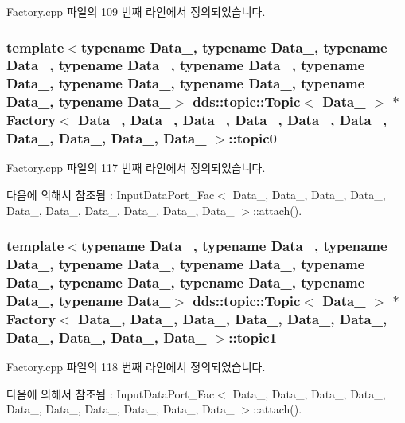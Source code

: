 Factory.\+cpp 파일의 109 번째 라인에서 정의되었습니다.

\subsubsection[{\texorpdfstring{topic0}{topic0}}]{\setlength{\rightskip}{0pt plus 5cm}template$<$typename Data\+\_, typename Data\+\_, typename Data\+\_, typename Data\+\_, typename Data\+\_, typename Data\+\_, typename Data\+\_, typename Data\+\_, typename Data\+\_, typename Data\+\_$>$ dds\+::topic\+::\+Topic$<$ Data\+\_ $>$ $\ast$ {\bf Factory}$<$ Data\+\_, Data\+\_, Data\+\_, Data\+\_, Data\+\_, Data\+\_, Data\+\_, Data\+\_, Data\+\_, Data\+\_ $>$\+::topic0}\hypertarget{classFactory_a575dfe382a4cbf779aa8b141fb38f2c4}{}\label{classFactory_a575dfe382a4cbf779aa8b141fb38f2c4}


Factory.\+cpp 파일의 117 번째 라인에서 정의되었습니다.



다음에 의해서 참조됨 \+:  Input\+Data\+Port\+\_\+\+Fac$<$ Data\+\_, Data\+\_, Data\+\_, Data\+\_, Data\+\_, Data\+\_, Data\+\_, Data\+\_, Data\+\_, Data\+\_ $>$\+::attach().

\subsubsection[{\texorpdfstring{topic1}{topic1}}]{\setlength{\rightskip}{0pt plus 5cm}template$<$typename Data\+\_, typename Data\+\_, typename Data\+\_, typename Data\+\_, typename Data\+\_, typename Data\+\_, typename Data\+\_, typename Data\+\_, typename Data\+\_, typename Data\+\_$>$ dds\+::topic\+::\+Topic$<$ Data\+\_ $>$ $\ast$ {\bf Factory}$<$ Data\+\_, Data\+\_, Data\+\_, Data\+\_, Data\+\_, Data\+\_, Data\+\_, Data\+\_, Data\+\_, Data\+\_ $>$\+::topic1}\hypertarget{classFactory_a0dfe2257a4968511148b107030387e25}{}\label{classFactory_a0dfe2257a4968511148b107030387e25}


Factory.\+cpp 파일의 118 번째 라인에서 정의되었습니다.



다음에 의해서 참조됨 \+:  Input\+Data\+Port\+\_\+\+Fac$<$ Data\+\_, Data\+\_, Data\+\_, Data\+\_, Data\+\_, Data\+\_, Data\+\_, Data\+\_, Data\+\_, Data\+\_ $>$\+::attach().

